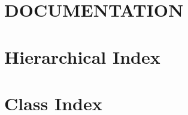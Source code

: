 \let\mypdfximage\pdfximage\def\pdfximage{\immediate\mypdfximage}\documentclass[twoside]{book}
\newcommand{\+}{\discretionary{\mbox{\scriptsize$\hookleftarrow$}}{}{}}
\begin{document}
\chapter{D\+O\+C\+U\+M\+E\+N\+T\+A\+T\+I\+ON}
\label{md__home_robson_ROBERT-PRACA-CHMURA_eclipse-workspace_capdDDEs5_81_82_docs_README}

\chapter{Hierarchical Index}

\chapter{Class Index}

\end{document}
